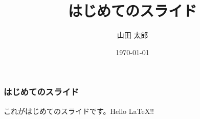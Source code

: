 \documentclass{beamer}
\title{はじめてのスライド}
\author{山田 太郎}
\institute{羅手府大学}
\date{\today}
\begin{document}
\maketitle
\begin{frame}
\frametitle{はじめてのスライド}
これがはじめてのスライドです。Hello \LaTeX !!
\end{frame}
\end{document}
